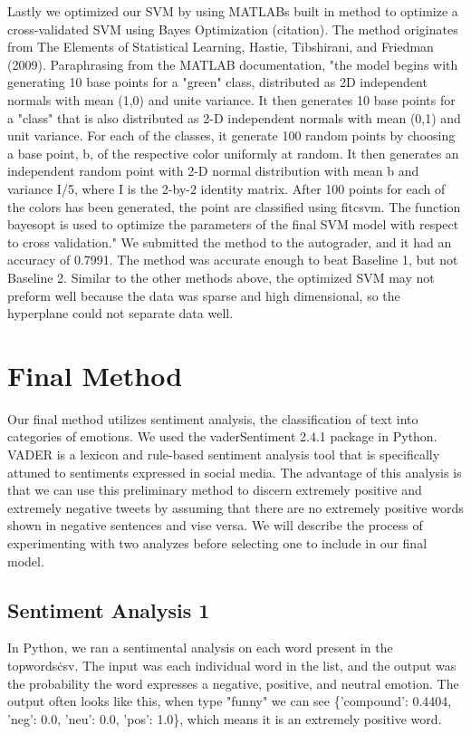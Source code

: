 \documentclass[]{article}
\begin{document}
Lastly we optimized our SVM by using MATLABs built in method to optimize a cross-validated SVM using Bayes Optimization (citation). The method originates from The Elements of Statistical Learning, Hastie, Tibshirani, and Friedman (2009). Paraphrasing from the MATLAB documentation,  "the model begins with generating 10 base points for a "green" class, distributed as 2D independent normals with mean (1,0) and unite variance. It then generates 10 base points for a "class" that is also distributed as 2-D independent normals with mean (0,1) and unit variance. For each of the classes, it generate 100 random points by choosing a base point, b, of the respective color uniformly at random. It then generates an independent random point with 2-D normal distribution with mean b and variance I/5, where I is the 2-by-2 identity matrix. After 100 points for each of the colors has been generated, the point are classified using fitcsvm. The function bayesopt is used to optimize the parameters of the final SVM model with respect to cross validation." We submitted the method to the autograder, and it had an accuracy of 0.7991. The method was accurate enough to beat Baseline 1, but not Baseline 2. Similar to the other methods above, the optimized SVM may not preform well because the data was sparse and high dimensional, so the hyperplane could not separate data well. 

\section{Final Method}

Our final method utilizes sentiment analysis, the classification of text into categories of emotions. We used the vaderSentiment 2.4.1 package in Python. VADER is a lexicon and rule-based sentiment analysis tool that is specifically attuned to sentiments expressed in social media. The advantage of this analysis is that we can use this preliminary method to discern extremely positive and extremely negative tweets by assuming that there are no extremely positive words shown in negative sentences and vise versa. We will describe the process of experimenting with two analyzes before selecting one to include in our final model. \\

\subsection{Sentiment Analysis 1}

In Python, we ran a sentimental analysis on each word present in the topwords\.csv. The input was each individual word in the list, and the output was the probability the word expresses a negative, positive, and neutral emotion. The output often looks like this, when type "funny" we can see \{'compound': 0.4404, 'neg': 0.0, 'neu': 0.0, 'pos': 1.0\}, which means it is an extremely positive word. \\
\end{document}
